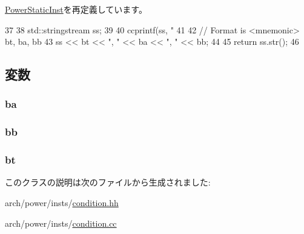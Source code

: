 \hyperlink{classPowerISA_1_1PowerStaticInst_a95d323a22a5f07e14d6b4c9385a91896}{PowerStaticInst}を再定義しています。


\begin{DoxyCode}
37 {
38     std::stringstream ss;
39 
40     ccprintf(ss, "%
41 
42     // Format is <mnemonic> bt, ba, bb
43     ss << bt << ", " << ba << ", " << bb;
44 
45     return ss.str();
46 }
\end{DoxyCode}


\subsection{変数}
\hypertarget{classPowerISA_1_1CondLogicOp_a308b637556f56bd59f2b395fe532d22c}{
\subsubsection[{ba}]{ {\bf ba}}}
\label{classPowerISA_1_1CondLogicOp_a308b637556f56bd59f2b395fe532d22c}
\hypertarget{classPowerISA_1_1CondLogicOp_a7760066aa9fbabdf004a08915f20d1af}{
\subsubsection[{bb}]{ {\bf bb}}}
\label{classPowerISA_1_1CondLogicOp_a7760066aa9fbabdf004a08915f20d1af}
\hypertarget{classPowerISA_1_1CondLogicOp_a6434b34834e09b379ccca809448977c3}{
\subsubsection[{bt}]{ {\bf bt}}}
\label{classPowerISA_1_1CondLogicOp_a6434b34834e09b379ccca809448977c3}


このクラスの説明は次のファイルから生成されました:\begin{DoxyCompactItemize}
\item 
arch/power/insts/\hyperlink{condition_8hh}{condition.hh}\item 
arch/power/insts/\hyperlink{condition_8cc}{condition.cc}\end{DoxyCompactItemize}
